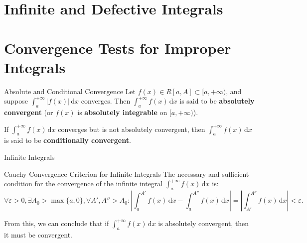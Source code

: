 \documentclass[11pt]{../../TexTemplate/elegantbook}
\begin{document}
\section{Infinite and Defective Integrals}

\section{Convergence Tests for Improper Integrals}

\begin{definition}{Absolute and Conditional Convergence}
    Let \( f(x) \in R[a, A] \subset [a, +\infty) \), and suppose \( \int_{a}^{+\infty} |f(x)| \, \mathrm{d}x \) converges. 
    Then \( \int_{a}^{+\infty} f(x) \, \mathrm{d}x \) is said to be \textbf{absolutely convergent} 
    (or \( f(x) \) is \textbf{absolutely integrable} on \( [a, +\infty) \)).

    If \( \int_{a}^{+\infty} f(x) \, \mathrm{d}x \) converges but is not absolutely convergent, 
    then \( \int_{a}^{+\infty} f(x) \, \mathrm{d}x \) is said to be \textbf{conditionally convergent}.
\end{definition}

\begin{leftbarTitle}{Infinite Integrals}\end{leftbarTitle}
\begin{theorem}{Cauchy Convergence Criterion for Infinite Integrals}
    The necessary and sufficient condition for the convergence of 
    the infinite integral \( \int_{a}^{+\infty} f(x) \, \mathrm{d}x \) is:
    \[
    \forall \varepsilon > 0, \exists A_0 > \max\{ a, 0 \}, \forall A', A'' > A_0 : 
    \left| \int_{a}^{A'} f(x) \, \mathrm{d}x - \int_{a}^{A''} f(x) \, \mathrm{d}x \right| 
    = \left| \int_{A'}^{A''} f(x) \, \mathrm{d}x \right| < \varepsilon.
    \]
\end{theorem}
From this, we can conclude that if \( \int_{a}^{+\infty} f(x) \, \mathrm{d}x \) is absolutely convergent, 
then it must be convergent.
\end{document}
